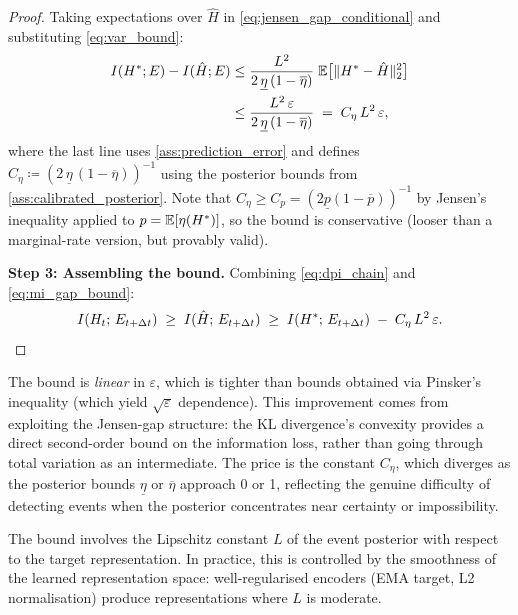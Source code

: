 \begin{proof}
Taking expectations over $\hat{H}$ in \eqref{eq:jensen_gap_conditional} and substituting \eqref{eq:var_bound}:
\begin{align}
I(H^*; E) - I(\hat{H}; E)
&\leq \frac{L^2}{2\,\underline{\eta}\,(1-\overline{\eta})}\;\mathbb{E}\bigl[\|H^* - \hat{H}\|_2^2\bigr] \notag \\
&\leq \frac{L^2\,\varepsilon}{2\,\underline{\eta}\,(1-\overline{\eta})} \;=\; C_\eta\,L^2\,\varepsilon, \label{eq:mi_gap_bound}
\end{align}
where the last line uses \ref{ass:prediction_error} and defines $C_\eta \coloneqq (2\,\underline{\eta}\,(1-\overline{\eta}))^{-1}$ using the posterior bounds from \ref{ass:calibrated_posterior}.
Note that $C_\eta \geq C_p = (2\underline{p}(1-\overline{p}))^{-1}$ by Jensen's inequality applied to $p = \mathbb{E}[\eta(H^*)]$, so the bound is conservative (looser than a marginal-rate version, but provably valid).

\textbf{Step 3: Assembling the bound.}
Combining \eqref{eq:dpi_chain} and \eqref{eq:mi_gap_bound}:
\begin{equation}
\label{eq:full_bound}
I(H_t;\, E_{t+\Delta t}) \;\geq\; I(\hat{H};\, E_{t+\Delta t}) \;\geq\; I(H^*;\, E_{t+\Delta t}) \;-\; C_\eta\,L^2\,\varepsilon. \qedhere
\end{equation}
\end{proof}

\begin{remark}
The bound is \emph{linear} in $\varepsilon$, which is tighter than bounds obtained via Pinsker's inequality (which yield $\sqrt{\varepsilon}$ dependence).
This improvement comes from exploiting the Jensen-gap structure: the KL divergence's convexity provides a direct second-order bound on the information loss, rather than going through total variation as an intermediate.
The price is the constant $C_\eta$, which diverges as the posterior bounds $\underline{\eta}$ or $\overline{\eta}$ approach 0 or 1, reflecting the genuine difficulty of detecting events when the posterior concentrates near certainty or impossibility.
\end{remark}

\begin{remark}
The bound involves the Lipschitz constant $L$ of the event posterior with respect to the target representation. In practice, this is controlled by the smoothness of the learned representation space: well-regularised encoders (EMA target, L2 normalisation) produce representations where $L$ is moderate.
\end{remark}

